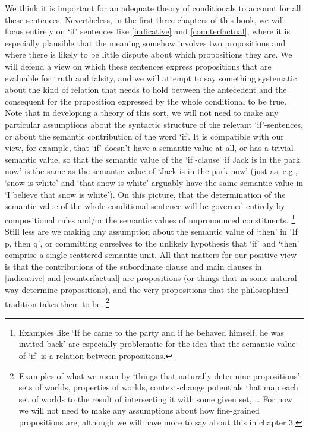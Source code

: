 \documentclass[If.tex]{subfiles}
\begin{document}
We think it is important for an adequate theory of conditionals to account for all these sentences. Nevertheless, in the first three chapters of this book, we will focus entirely on `if' sentences like \ref{indicative} and \ref{counterfactual}, where it is especially plausible that the meaning somehow involves two propositions and where there is likely to be little dispute about which propositions they are. We will defend a view on which these sentences express propositions that are evaluable for truth and falsity, and we will attempt to say something systematic about the kind of relation that needs to hold between the antecedent and the consequent for the proposition expressed by the whole conditional to be true. Note that in developing a theory of this sort, we will not need to make any particular assumptions about the syntactic structure of the relevant `if'-sentences, or about the semantic contribution of the word ‘if’. It is compatible with our view, for example, that ‘if’ doesn't have a semantic value at all, or has a trivial semantic value, so that the semantic value of the ‘if’-clause ‘if Jack is in the park now’ is the same as the semantic value of ‘Jack is in the park now’ (just as, e.g., ‘snow is white’ and ‘that snow is white’ arguably have the same semantic value in ‘I believe that snow is white’).  On this picture, that the determination of the semantic value of the whole conditional sentence will be governed entirely by compositional rules and/or the semantic values of unpronounced constituents.%
\footnote{Examples like ‘If he came to the party and if he behaved himself, he was invited back’ are especially problematic for the idea that the semantic value of ‘if’ is a relation between propositions.}
Still less are we making any assumption about the semantic value of ‘then’ in ‘If p, then q’, or committing ourselves to the unlikely hypothesis that ‘if’ and ‘then’ comprise a single scattered semantic unit. All that matters for our positive view is that the contributions of the subordinate clause and main clauses in \ref{indicative} and \ref{counterfactual} are propositions (or things that in some natural way determine propositions), and the very propositions that the philosophical tradition takes them to be.%
\footnote{Examples of what we mean by ‘things that naturally determine propositions’: sets of worlds, properties of worlds, context-change potentials that map each set of worlds to the result of intersecting it with some given set, \ldots{} For now we will not need to make any assumptions about how fine-grained propositions are, although we will have more to say about this in chapter 3.}
\end{document}
